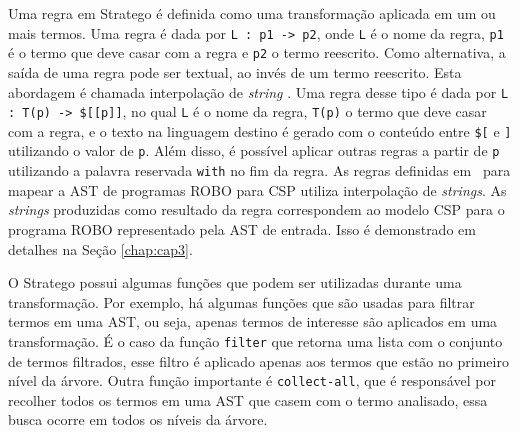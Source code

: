 Uma regra em Stratego é definida como uma transformação aplicada em um ou mais termos. Uma regra é dada por \texttt{L : p1 -> p2}, onde \texttt{L} é o nome da regra, \texttt{p1} é o termo que deve casar com a regra e \texttt{p2} o termo reescrito. Como alternativa, a saída de uma regra pode ser textual, ao invés de um termo reescrito. Esta abordagem é chamada interpolação de \textit{string} \cite{KatsSpoofax}. Uma regra desse tipo é dada por \texttt{L : T(p) -> \$[[p]]}, no qual \texttt{L} é o nome da regra, \texttt{T(p)} o termo que deve casar com a regra, e o texto na linguagem destino é gerado com o conteúdo entre \texttt{\$[} e \texttt{]} utilizando o valor de \texttt{p}. Além disso, é possível aplicar outras regras a partir de \texttt{p} utilizando a palavra reservada \texttt{with} no fim da regra. As regras definidas em~\cite{nogueira} para mapear a AST de programas ROBO para CSP utiliza interpolação de \textit{strings}. As \textit{strings} produzidas como resultado da regra correspondem ao modelo CSP para o programa ROBO representado pela AST de entrada. Isso é demonstrado em detalhes na Seção \ref{chap:cap3}. 


O Stratego possui algumas funções que podem ser utilizadas durante uma transformação. Por exemplo, há algumas funções que são usadas para filtrar termos em uma AST, ou seja, apenas termos de interesse são aplicados em uma transformação. É o caso da função \texttt{filter} que retorna uma lista com o conjunto de termos filtrados, esse filtro é aplicado apenas aos termos que estão no primeiro nível da árvore. Outra função importante é \texttt{collect-all}, que é responsável por recolher todos os termos em uma AST que casem com o termo analisado, essa busca ocorre em todos os níveis da árvore.

